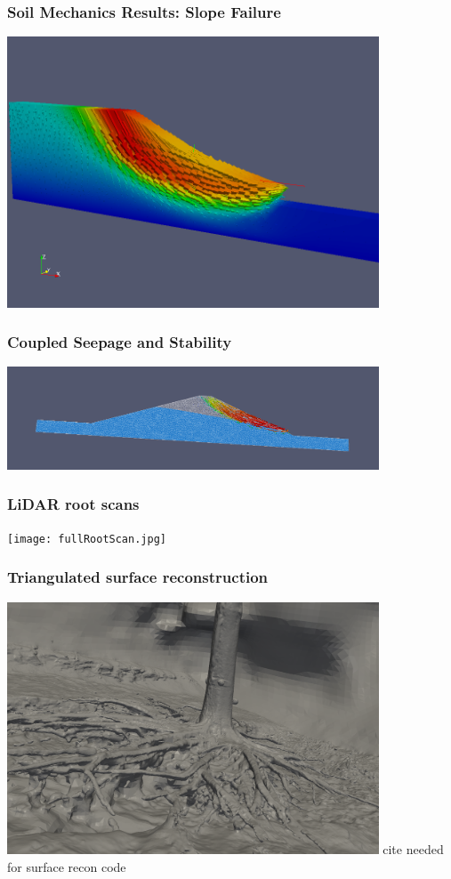\documentclass{beamer}
\begin{document}
\begin{frame}
\frametitle{Soil Mechanics Results: Slope Failure}
\includegraphics[width=4.35in]{sgfailure.png}
\end{frame}

\begin{frame}
\frametitle{Coupled Seepage and Stability}
\includegraphics[width=4.35in]{gl_6.png}
\end{frame}

\begin{frame}
\frametitle{LiDAR root scans}
\texttt{[image: fullRootScan.jpg]}
\end{frame}

\begin{frame}
\frametitle{Triangulated surface reconstruction}
\includegraphics[width=4.35in]{rootsPoissonRecon.png}
cite needed for surface recon code
\end{frame}
\end{document}
